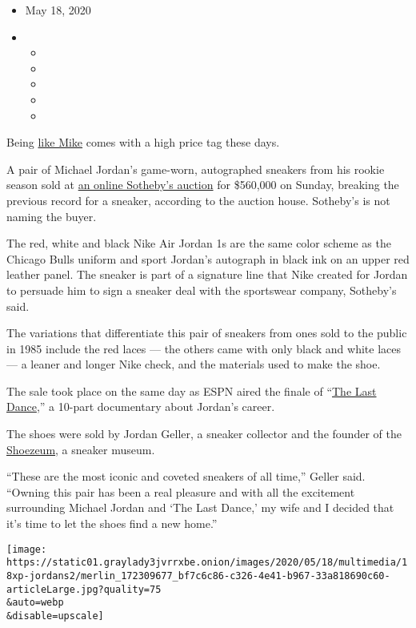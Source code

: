 \begin{itemize}
\item
  May 18, 2020
\item
  \begin{itemize}
  \item
  \item
  \item
  \item
  \item
  \end{itemize}
\end{itemize}

Being \href{https://www.youtube.com/watch?v=b0AGiq9j_Ak}{like Mike}
comes with a high price tag these days.

A pair of Michael Jordan's game-worn, autographed sneakers from his
rookie season sold at
\href{https://www.sothebys.com/en/press/slam-dunk-sothebys-sets-new-world-auction-record-for-any-pair-of-sneakers?locale=en}{an
online Sotheby's auction} for \$560,000 on Sunday, breaking the previous
record for a sneaker, according to the auction house. Sotheby's is not
naming the buyer.

The red, white and black Nike Air Jordan 1s are the same color scheme as
the Chicago Bulls uniform and sport Jordan's autograph in black ink on
an upper red leather panel. The sneaker is part of a signature line that
Nike created for Jordan to persuade him to sign a sneaker deal with the
sportswear company, Sotheby's said.

The variations that differentiate this pair of sneakers from ones sold
to the public in 1985 include the red laces --- the others came with
only black and white laces --- a leaner and longer Nike check, and the
materials used to make the shoe.

The sale took place on the same day as ESPN aired the finale of
``\href{https://www.nytimes3xbfgragh.onion/article/the-last-dance-jordan.html}{The
Last Dance},'' a 10-part documentary about Jordan's career.

The shoes were sold by Jordan Geller, a sneaker collector and the
founder of the \href{https://shoezeum.com/}{Shoezeum}, a sneaker museum.

``These are the most iconic and coveted sneakers of all time,'' Geller
said. ``Owning this pair has been a real pleasure and with all the
excitement surrounding Michael Jordan and `The Last Dance,' my wife and
I decided that it's time to let the shoes find a new home.''

\texttt{[image: https://static01.graylady3jvrrxbe.onion/images/2020/05/18/multimedia/18xp-jordans2/merlin\_172309677\_bf7c6c86-c326-4e41-b967-33a818690c60-articleLarge.jpg?quality=75\\\&auto=webp\\\&disable=upscale]}

